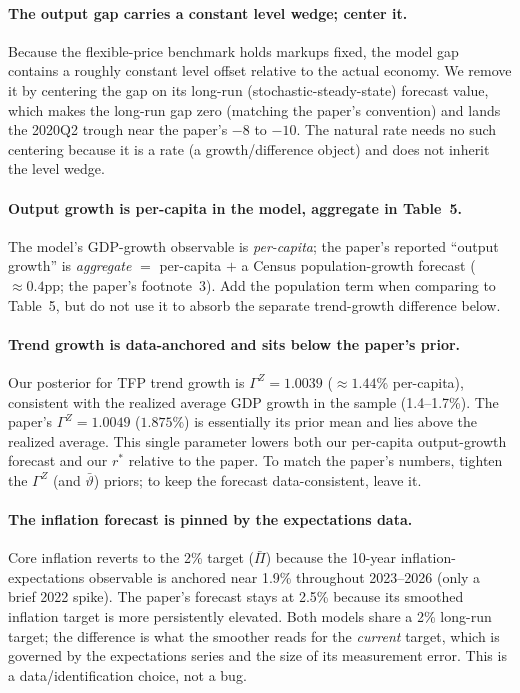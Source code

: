 \documentclass[11pt]{article}
\theoremstyle{definition}
\newcommand{\rstar}{r^{*}}
\begin{document}
\paragraph{The output gap carries a constant level wedge; center it.}
Because the flexible-price benchmark holds markups fixed, the model gap contains a roughly constant
level offset relative to the actual economy. We remove it by centering the gap on its long-run
(stochastic-steady-state) forecast value, which makes the long-run gap zero (matching the paper's
convention) and lands the 2020Q2 trough near the paper's $-8$ to $-10$. The natural rate needs no such
centering because it is a rate (a growth/difference object) and does not inherit the level wedge.

\paragraph{Output growth is per-capita in the model, aggregate in Table~5.}
The model's GDP-growth observable is \emph{per-capita}; the paper's reported ``output growth'' is
\emph{aggregate} $=$ per-capita $+$ a Census population-growth forecast ($\approx 0.4$pp; the paper's
footnote~3). Add the population term when comparing to Table~5, but do not use it to absorb the separate
trend-growth difference below.

\paragraph{Trend growth is data-anchored and sits below the paper's prior.}
Our posterior for TFP trend growth is $\Gamma^Z=1.0039$ ($\approx 1.44\%$ per-capita), consistent with
the realized average GDP growth in the sample (1.4--1.7\%). The paper's $\Gamma^Z=1.0049$ ($1.875\%$) is
essentially its prior mean and lies above the realized average. This single parameter lowers both our
per-capita output-growth forecast and our $\rstar$ relative to the paper. To match the paper's numbers,
tighten the $\Gamma^Z$ (and $\bar\vartheta$) priors; to keep the forecast data-consistent, leave it.

\paragraph{The inflation forecast is pinned by the expectations data.}
Core inflation reverts to the 2\% target ($\bar\Pi$) because the 10-year inflation-expectations
observable is anchored near 1.9\% throughout 2023--2026 (only a brief 2022 spike). The paper's forecast
stays at 2.5\% because its smoothed inflation target is more persistently elevated. Both models share a
2\% long-run target; the difference is what the smoother reads for the \emph{current} target, which is
governed by the expectations series and the size of its measurement error. This is a data/identification
choice, not a bug.
\end{document}
